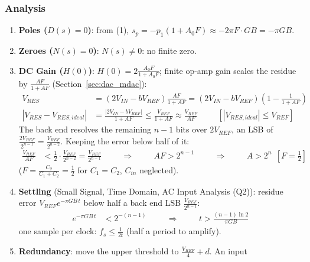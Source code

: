 \subsubsection{Analysis}
\begin{enumerate}
  \item \textbf{Poles (\(D(s) = 0\))}: from (1), \(s_p = -p_1(1 + A_0 F) \approx -2\pi F \cdot GB = -\pi GB\).
  \item \textbf{Zeroes (\(N(s) = 0\))}: \(N(s) \neq 0\): no finite zero.
  \item \textbf{DC Gain (\(H(0)\))}: \(H(0) = 2\frac{A_0 F}{1 + A_0 F}\); finite op-amp gain scales the residue by
    \(\frac{AF}{1 + AF}\) (Section~\ref{sec:dac_mdac}):
    \begin{align*}
      V_{RES} &= (2 V_{IN} - b V_{REF})\frac{AF}{1 + AF} = (2 V_{IN} - b V_{REF})\left(1 - \frac{1}{1 + AF}\right) \\
      |V_{RES} - V_{RES,ideal}| &= \frac{|2 V_{IN} - b V_{REF}|}{1 + AF} \leq \frac{V_{REF}}{1 + AF} \approx \frac{V_{REF}}{AF} \hspace{1cm} [|V_{RES,ideal}| \leq V_{REF}]
    \end{align*}
    The back end resolves the remaining \(n - 1\) bits over \(2V_{REF}\), an LSB of
    \(\frac{2V_{REF}}{2^{n-1}} = \frac{V_{REF}}{2^{n-2}}\). Keeping the error below half of it:
    \begin{align*}
      \frac{V_{REF}}{AF} &< \frac{1}{2}\cdot\frac{V_{REF}}{2^{n-2}} = \frac{V_{REF}}{2^{n-1}} \hspace{1cm} \Rightarrow \hspace{1cm}
      AF > 2^{n-1} \hspace{1cm} \Rightarrow \hspace{1cm} A > 2^{n} \ \ [F = \tfrac{1}{2}]
    \end{align*}
    (\(F = \frac{C_2}{C_1 + C_2} = \frac{1}{2}\) for \(C_1 = C_2\), \(C_{in}\) neglected).
  \item \textbf{Settling} (Small Signal, Time Domain, AC Input Analysis (Q2)): residue error
    \(V_{REF} e^{-\pi GB\, t}\) below half a back end LSB \(\frac{V_{REF}}{2^{n-1}}\):
    \begin{align*}
      e^{-\pi GB\, t} &< 2^{-(n-1)} \hspace{1cm} \Rightarrow \hspace{1cm} t > \frac{(n - 1)\ln 2}{\pi GB}
    \end{align*}
    one sample per clock: \(f_s \leq \frac{1}{2t}\) (half a period to amplify).
  \item \textbf{Redundancy}: move the upper threshold to \(\frac{V_{REF}}{4} + d\). An input

\end{enumerate}
